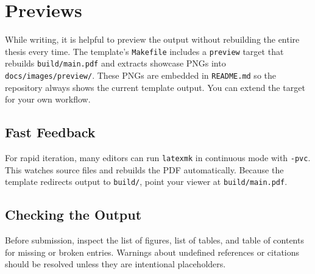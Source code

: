 \section{Previews}\label{ch5sec:previews}

While writing, it is helpful to preview the output without rebuilding the entire thesis every time. The template's \texttt{Makefile} includes a \texttt{preview} target that rebuilds \texttt{build/main.pdf} and extracts showcase PNGs into \texttt{docs/images/preview/}. These PNGs are embedded in \texttt{README.md} so the repository always shows the current template output. You can extend the target for your own workflow.

\begin{figure}[ht]
\centering
{}
\label{ch5fig:qualitative}
\end{figure}

\subsection{Fast Feedback}

For rapid iteration, many editors can run \texttt{latexmk} in continuous mode with \texttt{-pvc}. This watches source files and rebuilds the PDF automatically. Because the template redirects output to \texttt{build/}, point your viewer at \texttt{build/main.pdf}.

\subsection{Checking the Output}

Before submission, inspect the list of figures, list of tables, and table of contents for missing or broken entries. Warnings about undefined references or citations should be resolved unless they are intentional placeholders.

